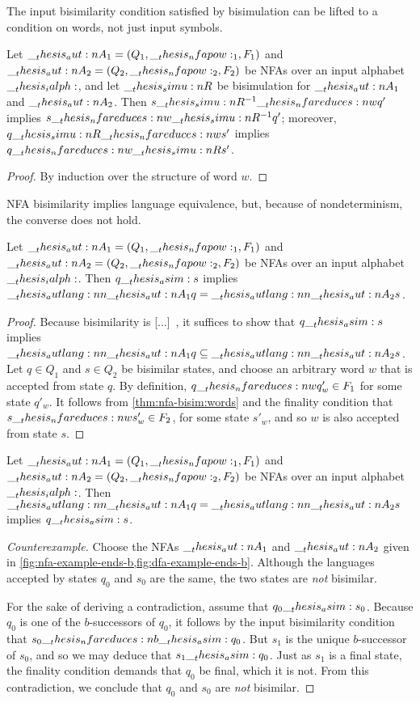 The input bisimilarity condition satisfied by  bisimulation can be lifted to a condition on words, not just input symbols.
%
\begin{theorem}\label{thm:nfa-bisim:words}
  Let $\__thesis_aut:n {A}_1 = (Q_1, \__thesis_nfapow:_1, F_1)$ and $\__thesis_aut:n {A}_2 = (Q_2, \__thesis_nfapow:_2, F_2)$ be \acp{NFA} over an input alphabet $\__thesis_ialph:$, and let $\__thesis_simu:n {R}$ be  bisimulation for $\__thesis_aut:n {A}_1$ and $\__thesis_aut:n {A}_2$.
  Then $s \simu{R}^{-1}\nfareduces[w] q'$ implies $s \nfareduces[w]\simu{R}^{-1} q'$; moreover, $q \simu{R}\nfareduces[w] s'$ implies $q \nfareduces[w]\simu{R} s'$.
\end{theorem}
%
\begin{proof}
  By induction over the structure of word $w$.
\end{proof}


\Ac{NFA} bisimilarity implies language equivalence, but, because of nondeterminism, the converse does not hold.
%
\begin{theorem}
  Let $\__thesis_aut:n {A}_1 = (Q_1, \__thesis_nfapow:_1, F_1)$ and $\__thesis_aut:n {A}_2 = (Q_2, \__thesis_nfapow:_2, F_2)$ be \acp{NFA} over an input alphabet $\__thesis_ialph:$.
  Then $q \__thesis_asim: s$ implies $\__thesis_autlang:nn {\__thesis_aut:n {A}_1} {q} = \__thesis_autlang:nn {\__thesis_aut:n {A}_2} {s}$.
\end{theorem}
%
\begin{proof}
  Because bisimilarity is [...]~, it suffices to show that $q \__thesis_asim: s$ implies $\__thesis_autlang:nn {\__thesis_aut:n {A}_1} {q} \subseteq \__thesis_autlang:nn {\__thesis_aut:n {A}_2} {s}$.
  Let $q \in Q_1$ and $s \in Q_2$ be bisimilar states, and choose an arbitrary word $w$ that is accepted from state $q$.
  By definition, $q \nfareduces[w] q'_w \in F_1$ for some state $q'_w$.
  It follows from \cref{thm:nfa-bisim:words} and the finality condition that $s \nfareduces[w] s'_w \in F_2$, for some state $s'_w$, and so $w$ is also accepted from state $s$.
\end{proof}
%
\begin{falseclaim}
  Let $\__thesis_aut:n {A}_1 = (Q_1, \__thesis_nfapow:_1, F_1)$ and $\__thesis_aut:n {A}_2 = (Q_2, \__thesis_nfapow:_2, F_2)$ be \acp{NFA} over an input alphabet $\__thesis_ialph:$.
  Then $\__thesis_autlang:nn {\__thesis_aut:n {A}_1} {q} = \__thesis_autlang:nn {\__thesis_aut:n {A}_2} {s}$ implies $q \__thesis_asim: s$.
\end{falseclaim}
%
\begin{proof}[Counterexample]
  Choose the \acp{NFA} $\__thesis_aut:n {A}_1$ and $\__thesis_aut:n {A}_2$ given in \cref{fig:nfa-example-ends-b,fig:dfa-example-ends-b}.
  Although the languages accepted by states $q_0$ and $s_0$ are the same, the two states are \emph{not} bisimilar.

  For the sake of deriving a contradiction, assume that $q_0 \__thesis_asim: s_0$.
  Because $q_0$ is one of the $b$-successors of $q_0$, it follows by the input bisimilarity condition that $s_0 \nfareduces[\smash{b}]\asim q_0$.
  But $s_1$ is the unique $b$-successor of $s_0$, and so we may deduce that $s_1 \__thesis_asim: q_0$.
  Just as $s_1$ is a final state, the finality condition demands that $q_0$ be final, which it is not.
  From this contradiction, we conclude that $q_0$ and $s_0$ are \emph{not} bisimilar. 
\end{proof}

